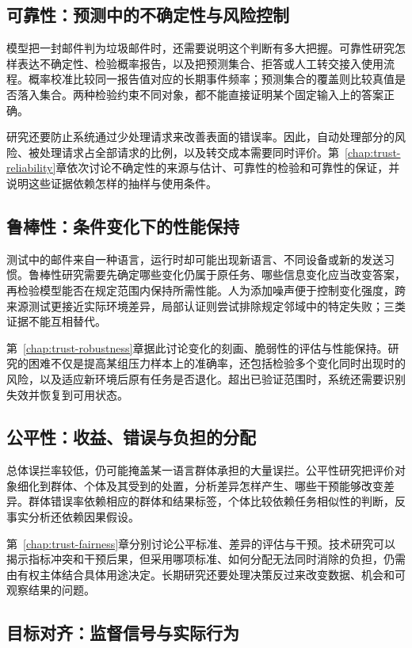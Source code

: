\subsection{可靠性：预测中的不确定性与风险控制}

模型把一封邮件判为垃圾邮件时，还需要说明这个判断有多大把握。可靠性研究怎样表达不确定性、检验概率报告，以及把预测集合、拒答或人工转交接入使用流程。概率校准比较同一报告值对应的长期事件频率；预测集合的覆盖则比较真值是否落入集合。两种检验约束不同对象，都不能直接证明某个固定输入上的答案正确。

研究还要防止系统通过少处理请求来改善表面的错误率。因此，自动处理部分的风险、被处理请求占全部请求的比例，以及转交成本需要同时评价。第~\ref{chap:trust-reliability}章依次讨论不确定性的来源与估计、可靠性的检验和可靠性的保证，并说明这些证据依赖怎样的抽样与使用条件。

\subsection{鲁棒性：条件变化下的性能保持}

测试中的邮件来自一种语言，运行时却可能出现新语言、不同设备或新的发送习惯。鲁棒性研究需要先确定哪些变化仍属于原任务、哪些信息变化应当改变答案，再检验模型能否在规定范围内保持所需性能。人为添加噪声便于控制变化强度，跨来源测试更接近实际环境差异，局部认证则尝试排除规定邻域中的特定失败；三类证据不能互相替代。

第~\ref{chap:trust-robustness}章据此讨论变化的刻画、脆弱性的评估与性能保持。研究的困难不仅是提高某组压力样本上的准确率，还包括检验多个变化同时出现时的风险，以及适应新环境后原有任务是否退化。超出已验证范围时，系统还需要识别失效并恢复到可用状态。

\subsection{公平性：收益、错误与负担的分配}

总体误拦率较低，仍可能掩盖某一语言群体承担的大量误拦。公平性研究把评价对象细化到群体、个体及其受到的处置，分析差异怎样产生、哪些干预能够改变差异。群体错误率依赖相应的群体和结果标签，个体比较依赖任务相似性的判断，反事实分析还依赖因果假设。

第~\ref{chap:trust-fairness}章分别讨论公平标准、差异的评估与干预。技术研究可以揭示指标冲突和干预后果，但采用哪项标准、如何分配无法同时消除的负担，仍需由有权主体结合具体用途决定。长期研究还要处理决策反过来改变数据、机会和可观察结果的问题。

\subsection{目标对齐：监督信号与实际行为}


